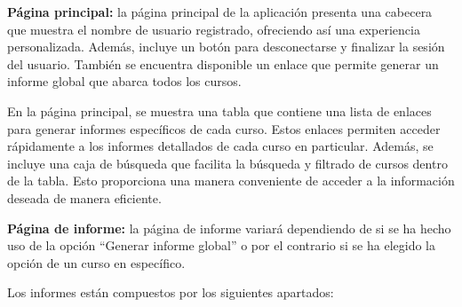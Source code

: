 \textbf{Página principal:} la página principal de la aplicación presenta una cabecera que muestra el nombre de usuario registrado, ofreciendo así una experiencia personalizada. Además, incluye un botón para desconectarse y finalizar la sesión del usuario. También se encuentra disponible un enlace que permite generar un informe global que abarca todos los cursos.

En la página principal, se muestra una tabla que contiene una lista de enlaces para generar informes específicos de cada curso. Estos enlaces permiten acceder rápidamente a los informes detallados de cada curso en particular. Además, se incluye una caja de búsqueda que facilita la búsqueda y filtrado de cursos dentro de la tabla. Esto proporciona una manera conveniente de acceder a la información deseada de manera eficiente.

\textbf{Página de informe:} la página de informe variará dependiendo de si se ha hecho uso de la opción ``Generar informe global'' o por el contrario si se ha elegido la opción de un curso en específico.~

Los informes están compuestos por los siguientes apartados:


